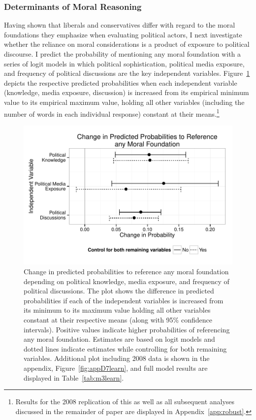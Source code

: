 \documentclass[12pt]{article}
\begin{document}
\subsubsection{Determinants of Moral Reasoning}

Having shown that liberals and conservatives differ with regard to the moral foundations they emphasize when evaluating political actors, I next investigate whether the reliance on moral considerations is a product of exposure to political discourse. I predict the probability of mentioning any moral foundation with a series of logit models in which political sophistication, political media exposure, and frequency of political discussions are the key independent variables. Figure~\ref{fig:3learn} depicts the respective predicted probabilities when each independent variable (knowledge, media exposure, discussion) is increased from its empirical minimum value to its empirical maximum value, holding all other variables (including the number of words in each individual response) constant at their means.\footnote{Results for the 2008 replication of this as well as all subsequent analyses discussed in the remainder of paper are displayed in Appendix~\ref{app:robust}.}

\begin{figure}[h]\centering
\includegraphics[scale=.9]{../calc/fig/fig3learn.pdf}
\caption{Change in predicted probabilities to reference any moral foundation depending on political knowledge, media exposure, and frequency of political discussions. The plot shows the difference in predicted probabilities if each of the independent variables is increased from its minimum to its maximum value holding all other variables constant at their respective means (along with 95\% confidence intervals). Positive values indicate higher probabilities of referencing any moral foundation. Estimates are based on logit models and dotted lines indicate estimates while controlling for both remaining variables. Additional plot including 2008 data is shown in the appendix, Figure~\ref{fig:appD7learn}, and full model results are displayed in Table~\ref{tab:m3learn}.}\label{fig:3learn}
\end{figure}
\end{document}
